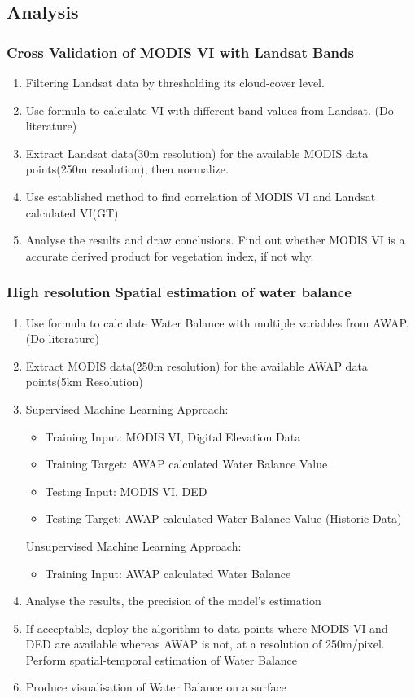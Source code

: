 \documentclass[12pt,journal,compsoc,onecolumn]{IEEEtran}
\begin{document}
\subsection{Analysis}\label{Subsection:analysisstage}
\subsubsection{Cross Validation of MODIS VI with Landsat Bands}
\begin{enumerate}
\item
Filtering Landsat data by thresholding its cloud-cover level.
\item
Use formula to calculate VI with different band values from Landsat. (Do literature)
\item
Extract Landsat data(30m resolution) for the available MODIS data points(250m resolution), then normalize.
\item
Use established method to find correlation of MODIS VI and Landsat calculated VI(GT)
\item
Analyse the results and draw conclusions. Find out whether MODIS VI is a accurate derived product for vegetation index, if not why.
\end{enumerate}

\subsubsection{High resolution Spatial estimation of water balance}
\begin{enumerate}
\item
Use formula to calculate Water Balance with multiple variables from AWAP. (Do literature)
\item
Extract MODIS data(250m resolution) for the available AWAP data points(5km Resolution)
\item
Supervised Machine Learning Approach:
\begin{itemize}
\item
Training Input: MODIS VI, Digital Elevation Data
\item
Training Target: AWAP calculated Water Balance Value
\item
Testing Input: MODIS VI, DED
\item
Testing Target: AWAP calculated Water Balance Value (Historic Data)
\end{itemize}
Unsupervised Machine Learning Approach:
\begin{itemize}
\item
Training Input: AWAP calculated Water Balance
\end{itemize}
\item
Analyse the results, the precision of the model's estimation
\item
If acceptable, deploy the algorithm to data points where MODIS VI and DED are available whereas AWAP is not, at a resolution of 250m/pixel. Perform spatial-temporal estimation of Water Balance
\item
Produce visualisation of Water Balance on a surface
\end{enumerate}
\end{document}

